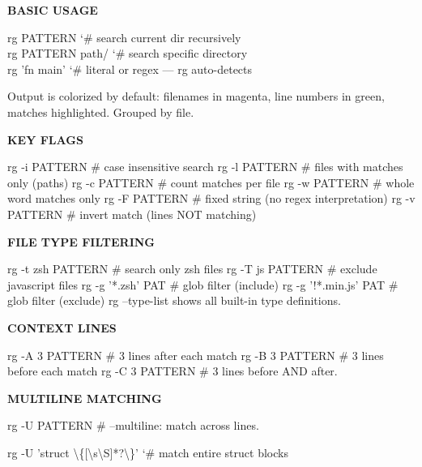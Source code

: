 \documentclass[11pt,a4paper,twoside]{book}
\begin{document}
\vspace{12pt}
{\bfseries\color{neonyellow} BASIC USAGE}\vspace{4pt}

\begin{codebox}
\color{neongreen}rg PATTERN           {\char`\#} search current dir recursively\\
\color{neongreen}rg PATTERN path/     {\char`\#} search specific directory\\
\color{neongreen}rg 'fn main'         {\char`\#} literal or regex — rg auto-detects\\
\end{codebox}

Output is colorized by default: filenames in magenta, line numbers in green, matches highlighted. Grouped by file.


\vspace{12pt}
{\bfseries\color{neonyellow} KEY FLAGS}\vspace{4pt}

rg -i PATTERN       \# case insensitive search rg -l PATTERN       \# files with matches only (paths) rg -c PATTERN       \# count matches per file rg -w PATTERN       \# whole word matches only rg -F PATTERN       \# fixed string (no regex interpretation) rg -v PATTERN       \# invert match (lines NOT matching)


\vspace{12pt}
{\bfseries\color{neonyellow} FILE TYPE FILTERING}\vspace{4pt}

rg -t zsh PATTERN   \# search only zsh files rg -T js PATTERN    \# exclude javascript files rg -g '*.zsh' PAT   \# glob filter (include) rg -g '!*.min.js' PAT \# glob filter (exclude) rg --type-list shows all built-in type definitions.


\vspace{12pt}
{\bfseries\color{neonyellow} CONTEXT \textbf{LINES}}\vspace{4pt}

rg -A 3 PATTERN     \# 3 lines after each match rg -B 3 PATTERN     \# 3 lines before each match rg -C 3 PATTERN     \# 3 lines before AND after.


\vspace{12pt}
{\bfseries\color{neonyellow} MULTILINE MATCHING}\vspace{4pt}

rg -U PATTERN       \# --multiline: match across lines.

\begin{codebox}
\color{neongreen}rg -U 'struct \textbackslash{}\{[\textbackslash{}s\textbackslash{}S]*?\textbackslash{}\}' {\char`\#} match entire struct blocks\\
\end{codebox}
\end{document}
